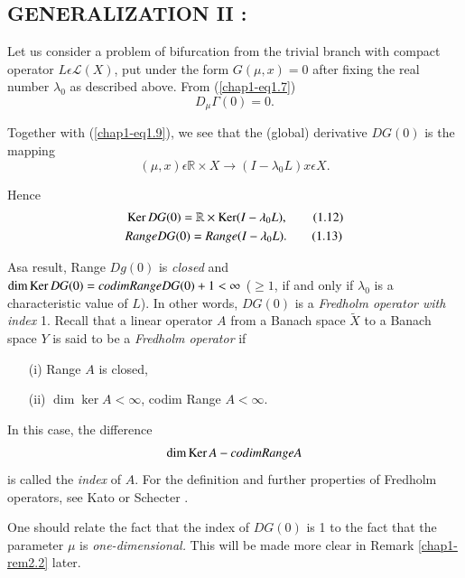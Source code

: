 \subsection{GENERALIZATION II :}\label{chap1-subsec1.1c}
Let us consider a problem of bifurcation from the trivial branch with compact operator $L \epsilon \mathscr{L} (X)$, put under the form $G(\mu, x) = 0$ after fixing the real number $\lambda_{0}$ as described above. From (\ref{chap1-eq1.7})
\begin{equation*}
D_{\mu} \Gamma(0) = 0.\tag{1.10}\label{chap1-eq1.10}
\end{equation*}

Together with (\ref{chap1-eq1.9}), we see that the (global) derivative $DG(0)$ is the mapping
\begin{equation*}
(\mu, x) \epsilon \mathbb{R} \times X \to (I - \lambda_{0} L) x \epsilon X.\tag{1.11}\label{chap1-eq1.11}
\end{equation*}

Hence
\begin{align*}
& \operatorname{Ker} DG(0) = \mathbb{R} \times \operatorname{Ker}(I - \lambda_{0} L),\tag{1.12}\label{chap1-eq1.12}\\
& Range DG(0) = Range (I - \lambda_{0}L).\tag{1.13}\label{chap1-eq1.13}
\end{align*}

As\pageoriginale a result, Range $Dg(0)$ is {\em closed} and $\dim \Ker DG(0) = codim\break Range DG(0) + 1 < \infty$ ($\geq 1$, if and only if $\lambda_{0}$ is a characteristic value of $L$). In other words, $DG(0)$ is a {\em Fredholm operator with index} 1. Recall that a linear operator $A$ from a Banach space $\widetilde{X}$ to a Banach space $Y$ is said to be a {\em Fredholm operator} if
\begin{enumerate}
\item[(i)] Range $A$ is closed,

\item[(ii)] $\dim \ker A < \infty$, codim Range $A < \infty$.
\end{enumerate}

In this case, the difference
$$
\dim \operatorname{Ker} A - codim Range A
$$
is called the {\em index} of $A$. For the definition and further properties of Fredholm operators, see Kato \cite{17} or Schecter \cite{36}.

\begin{remark}\label{chap1-rem1.3}
One should relate the fact that the index of $DG(0)$ is 1 to the fact that the parameter $\mu$ is {\em one-dimensional.} This will be made more clear in Remark \ref{chap1-rem2.2} later.
\end{remark}

